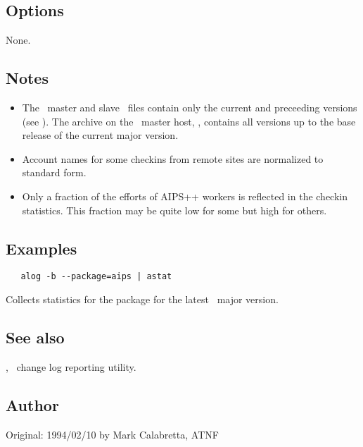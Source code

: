 \subsection*{Options}
 
None.
 
\subsection*{Notes}
 
\begin{itemize}
\item
   The \aipspp\ master and slave \rcs\ files contain only the current and
   preceeding versions (see ).  The archive on the \aipspp\
   master host, ,  contains all versions up to the base
   release of the current major version.

\item
   Account names for some checkins from remote sites are normalized to
   standard form.

\item
   Only a fraction of the efforts of AIPS++ workers is reflected in the
   checkin statistics.  This fraction may be quite low for some but high for
   others.
\end{itemize}

\subsection*{Examples}

\begin{verbatim}
   alog -b --package=aips | astat
\end{verbatim}

\noindent
Collects statistics for the  package for the latest \aipspp\ major
version.
 
\subsection*{See also}
 
, \aipspp\ change log reporting utility.
 
\subsection*{Author}
 
Original: 1994/02/10 by Mark Calabretta, ATNF



